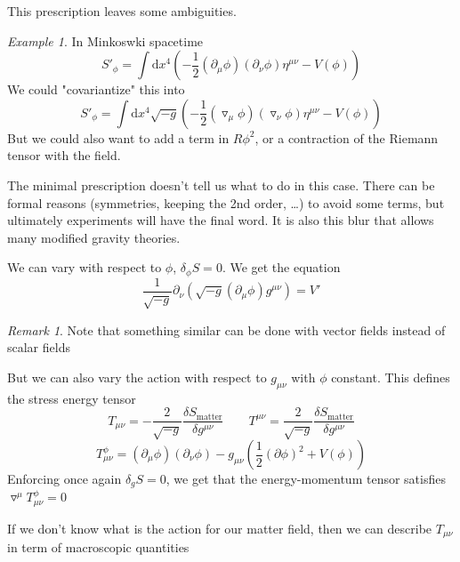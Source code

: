 \documentclass[a4paper]{book}
\theoremstyle{definition}
\theoremstyle{remark}
\newtheorem*{remark}{Remark}
\newtheorem*{example}{Example}
\begin{document}
This prescription leaves some ambiguities. 
\begin{example}
    In Minkoswki spacetime 
    \begin{equation}
        S'_\phi = \int \text{d}x^4 \left( -\frac{1}{2}(\partial_\mu \phi)(\partial_\nu \phi) \eta^{\mu\nu} - V(\phi)\right)
    \end{equation}
    We could "covariantize" this into 
    \begin{equation}
        S'_\phi = \int \text{d}x^4 \sqrt{-g}\left( -\frac{1}{2}(\triangledown_\mu \phi)(\triangledown_\nu \phi) \eta^{\mu\nu} - V(\phi)\right)
    \end{equation}
    But we could also want to add a term in $R\phi^2$, or a contraction of the Riemann tensor with the field. 
\end{example}
The minimal prescription doesn't tell us what to do in this case. There can be formal reasons (symmetries, keeping the 2nd order, \dots) to avoid some terms, but ultimately experiments will have the final word. It is also this blur that allows many modified gravity theories. \par \medskip 

We can vary with respect to $\phi$, $\delta_\phi S = 0$. We get the equation 
\begin{equation}
    \frac{1}{\sqrt{-g}}\partial_\nu (\sqrt{-g}(\partial_\mu \phi)g^{\mu\nu}) = V'
\end{equation}
\begin{remark}
    Note that something similar can be done with vector fields instead of scalar fields
\end{remark}
But we can also vary the action with respect to $g_{\mu\nu}$ with $\phi$ constant. This defines the stress energy tensor 
\begin{equation}
    T_{\mu\nu} = -\frac{2}{\sqrt{-g}}\frac{\delta S_{\text{matter}}}{\delta g^{\mu\nu}} \qquad  T^{\mu\nu} = \frac{2}{\sqrt{-g}}\frac{\delta S_{\text{matter}}}{\delta g^{\mu\nu}} 
\end{equation}
\begin{equation}
    T^\phi_{\mu\nu} = (\partial_\mu\phi)(\partial_\nu \phi) - g_{\mu\nu}\left(\frac{1}{2}(\partial \phi)^2 + V(\phi)\right)
\end{equation}
Enforcing once again $\delta_g S = 0$, we get that the energy-momentum tensor satisfies $\triangledown^\mu T^\phi_{\mu\nu} = 0$ \par \medskip 

If we don't know what is the action for our matter field, then we can describe $T_{\mu\nu}$ in term of macroscopic quantities
\end{document}
